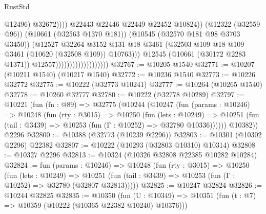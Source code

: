 \begin{lexlean}{RustStd}
\begin{coremodule}
                                                          @12496)
                                                        @32672))))
                                                @22443
                                                @22446
                                                @22449
                                                @22452
                                                @10824))
                                            (@12322 (@32559 @96))
                                            (@10661 (@32563 @1370 @181))
                                            (@10545 (@32570 @181 @98 @3703 @3450))
                                            (@12527
                                              @32264
                                              @3152
                                              @131
                                              @18
                                              @3461
                                              (@32503
                                                @109
                                                @18
                                                @109
                                                @3461
                                                (@10620 (@32508 @109))
                                                @10763)))
                                          @12545
                                          (@10661 (@30172 @2283 @1371))
                                          @12557)))))))))))))))))))
@32767 := @10205 @1540
@32771 := @10207 (@10211 @1540) (@10217 @1540)
@32772 := @10236 @1540
@32773 := @10226 @32772
@32775 := @10222 (@32773 @10241)
@32777 := @10264 (@10265 @1540)
@32778 := @10260 @32777
@32780 := @10222 (@32778 @10289)
@32797 := @10221
    (fun (fn : @89) =>
    @32775
      (@10244
        (@10247
          (fun (params : @10246) =>
          @10248
            (fun (rty : @3015) =>
            @10250
              (fun (lets : @10249) =>
              @10251 (fun (tail : @3439) => @10253 (fun (Γ : @10252) => @32780 @10336))))))
        @10382))
    @2296
@32800 := @10388 (@32773 (@10239 @2296))
@32803 := @10301 (@10302 @2296) @22382
@32807 := @10222 (@10293 (@32803 @10310) @10314)
@32808 := @10327 @2296
@32813 := @10324 (@10326 @32808 @22385 @10282 @10284)
@32824 := fun (params : @10246) =>
  @10248
    (fun (rty : @3015) =>
    @10250
      (fun (lets : @10249) =>
      @10251 (fun (tail : @3439) => @10253 (fun (Γ : @10252) => @32780 (@32807 @32813)))))
@32825 := @10247 @32824
@32826 := @10244 @32825
@32835 := @10350
    (fun (U : @10349) => @10351 (fun (t : @7) => @10359 (@10222 (@10365 @22382 @10240) @10376)))

\end{coremodule}
\end{lexlean}
